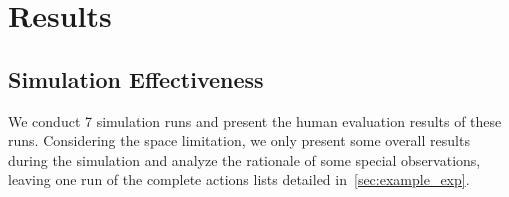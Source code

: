 \documentclass{article}
\begin{document}



\section{Results}

\subsection{Simulation Effectiveness}
\label{sec:human_eval}
We conduct 7 simulation runs and present the human evaluation results of these runs. Considering the space limitation, we only present some overall results during the simulation and analyze the rationale of some special observations, leaving one run of the complete actions lists detailed in~\autoref{sec:example_exp}. 
\end{document}
